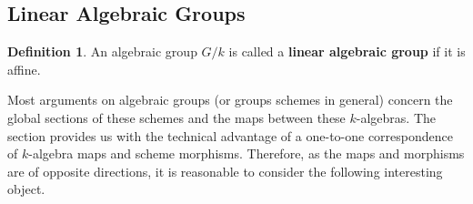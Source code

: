 \documentclass[12pt]{article}
\theoremstyle{remark}
\theoremstyle{definition}
\newtheorem{definition}{Definition}[section]
\begin{document}
    \subsection{Linear Algebraic Groups}
    \begin{definition}
        An algebraic group $G/k$ is called a \textbf{linear algebraic group} if it is affine.
    \end{definition}
    Most arguments on algebraic groups (or groups schemes in general) concern the global sections of these schemes and the maps between these $k$-algebras. The section provides us with the technical advantage of a one-to-one correspondence of $k$-algebra maps and scheme morphisms. Therefore, as the maps and morphisms are of opposite directions, it is reasonable to consider the following interesting object.
\end{document}
